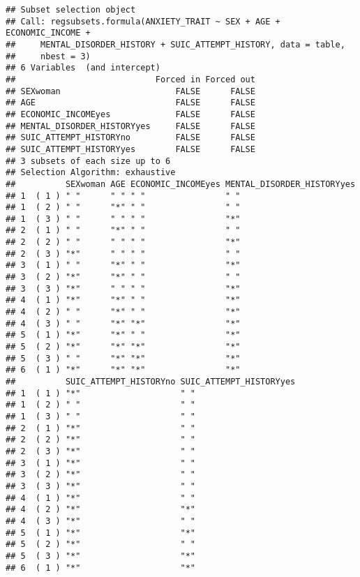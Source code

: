 \documentclass[
]{book}
\begin{document}
\begin{verbatim}
## Subset selection object
## Call: regsubsets.formula(ANXIETY_TRAIT ~ SEX + AGE + ECONOMIC_INCOME + 
##     MENTAL_DISORDER_HISTORY + SUIC_ATTEMPT_HISTORY, data = table, 
##     nbest = 3)
## 6 Variables  (and intercept)
##                            Forced in Forced out
## SEXwoman                       FALSE      FALSE
## AGE                            FALSE      FALSE
## ECONOMIC_INCOMEyes             FALSE      FALSE
## MENTAL_DISORDER_HISTORYyes     FALSE      FALSE
## SUIC_ATTEMPT_HISTORYno         FALSE      FALSE
## SUIC_ATTEMPT_HISTORYyes        FALSE      FALSE
## 3 subsets of each size up to 6
## Selection Algorithm: exhaustive
##          SEXwoman AGE ECONOMIC_INCOMEyes MENTAL_DISORDER_HISTORYyes
## 1  ( 1 ) " "      " " " "                " "                       
## 1  ( 2 ) " "      "*" " "                " "                       
## 1  ( 3 ) " "      " " " "                "*"                       
## 2  ( 1 ) " "      "*" " "                " "                       
## 2  ( 2 ) " "      " " " "                "*"                       
## 2  ( 3 ) "*"      " " " "                " "                       
## 3  ( 1 ) " "      "*" " "                "*"                       
## 3  ( 2 ) "*"      "*" " "                " "                       
## 3  ( 3 ) "*"      " " " "                "*"                       
## 4  ( 1 ) "*"      "*" " "                "*"                       
## 4  ( 2 ) " "      "*" " "                "*"                       
## 4  ( 3 ) " "      "*" "*"                "*"                       
## 5  ( 1 ) "*"      "*" " "                "*"                       
## 5  ( 2 ) "*"      "*" "*"                "*"                       
## 5  ( 3 ) " "      "*" "*"                "*"                       
## 6  ( 1 ) "*"      "*" "*"                "*"                       
##          SUIC_ATTEMPT_HISTORYno SUIC_ATTEMPT_HISTORYyes
## 1  ( 1 ) "*"                    " "                    
## 1  ( 2 ) " "                    " "                    
## 1  ( 3 ) " "                    " "                    
## 2  ( 1 ) "*"                    " "                    
## 2  ( 2 ) "*"                    " "                    
## 2  ( 3 ) "*"                    " "                    
## 3  ( 1 ) "*"                    " "                    
## 3  ( 2 ) "*"                    " "                    
## 3  ( 3 ) "*"                    " "                    
## 4  ( 1 ) "*"                    " "                    
## 4  ( 2 ) "*"                    "*"                    
## 4  ( 3 ) "*"                    " "                    
## 5  ( 1 ) "*"                    "*"                    
## 5  ( 2 ) "*"                    " "                    
## 5  ( 3 ) "*"                    "*"                    
## 6  ( 1 ) "*"                    "*"
\end{verbatim}
\end{document}
